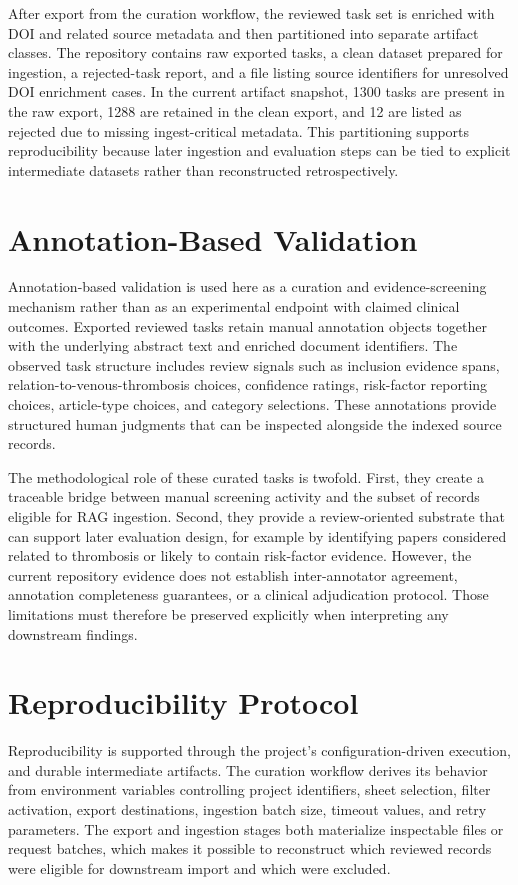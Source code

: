 After export from the curation workflow, the reviewed task set is enriched with DOI and related source metadata and then partitioned into separate artifact classes. The repository contains raw exported tasks, a clean dataset prepared for ingestion, a rejected-task report, and a file listing source identifiers for unresolved DOI enrichment cases. In the current artifact snapshot, 1300 tasks are present in the raw export, 1288 are retained in the clean export, and 12 are listed as rejected due to missing ingest-critical metadata. This partitioning supports reproducibility because later ingestion and evaluation steps can be tied to explicit intermediate datasets rather than reconstructed retrospectively.

\section{Annotation-Based Validation}

Annotation-based validation is used here as a curation and evidence-screening mechanism rather than as an experimental endpoint with claimed clinical outcomes. Exported reviewed tasks retain manual annotation objects together with the underlying abstract text and enriched document identifiers. The observed task structure includes review signals such as inclusion evidence spans, relation-to-venous-thrombosis choices, confidence ratings, risk-factor reporting choices, article-type choices, and category selections. These annotations provide structured human judgments that can be inspected alongside the indexed source records.

The methodological role of these curated tasks is twofold. First, they create a traceable bridge between manual screening activity and the subset of records eligible for RAG ingestion. Second, they provide a review-oriented substrate that can support later evaluation design, for example by identifying papers considered related to thrombosis or likely to contain risk-factor evidence. However, the current repository evidence does not establish inter-annotator agreement, annotation completeness guarantees, or a clinical adjudication protocol. Those limitations must therefore be preserved explicitly when interpreting any downstream findings.

\section{Reproducibility Protocol}

Reproducibility is supported through the project's configuration-driven execution, and durable intermediate artifacts. The curation workflow derives its behavior from environment variables controlling project identifiers, sheet selection, filter activation, export destinations, ingestion batch size, timeout values, and retry parameters. The export and ingestion stages both materialize inspectable files or request batches, which makes it possible to reconstruct which reviewed records were eligible for downstream import and which were excluded.

